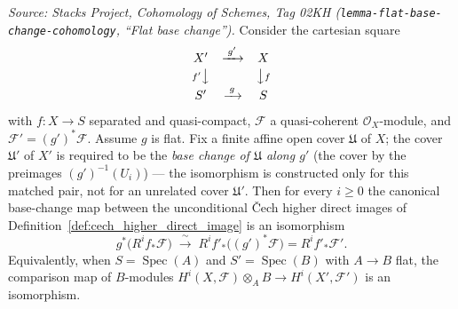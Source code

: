 \begin{lemma}
  \label{lem:cech_flat_base_change}
  \textit{Source: Stacks Project, Cohomology of Schemes, Tag 02KH
  (\texttt{lemma-flat-base-change-cohomology}, ``Flat base change'').}
  Consider the cartesian square
  \[
    \begin{array}{ccc}
      X' & \xrightarrow{\;g'\;} & X \\[2pt]
      {\scriptstyle f'}\big\downarrow & & \big\downarrow{\scriptstyle f} \\[2pt]
      S' & \xrightarrow{\;g\;} & S
    \end{array}
  \]
  with \(f : X \to S\) separated and quasi-compact, \(\mathcal{F}\) a
  quasi-coherent \(\mathcal{O}_X\)-module, and
  \(\mathcal{F}' = (g')^*\mathcal{F}\). Assume \(g\) is flat. Fix a finite affine
  open cover \(\mathfrak{U}\) of \(X\); the cover \(\mathfrak{U}'\) of \(X'\) is
  required to be the \emph{base change of \(\mathfrak{U}\) along \(g'\)} (the cover
  by the preimages \((g')^{-1}(U_i)\)) — the isomorphism is constructed only for
  this matched pair, not for an unrelated cover \(\mathfrak{U}'\). Then for every
  \(i \geq 0\) the canonical base-change map between the unconditional {\v C}ech
  higher direct images of Definition~\ref{def:cech_higher_direct_image} is an
  isomorphism
  \[
    g^*\bigl(R^i f_*\mathcal{F}\bigr) \;\xrightarrow{\;\sim\;}\;
      R^i f'_*\bigl((g')^*\mathcal{F}\bigr) = R^i f'_*\mathcal{F}'.
  \]
  Equivalently, when \(S = \operatorname{Spec}(A)\) and
  \(S' = \operatorname{Spec}(B)\) with \(A \to B\) flat, the comparison map of
  \(B\)-modules \(H^i(X, \mathcal{F}) \otimes_A B \to H^i(X', \mathcal{F}')\) is an
  isomorphism.
\end{lemma}


